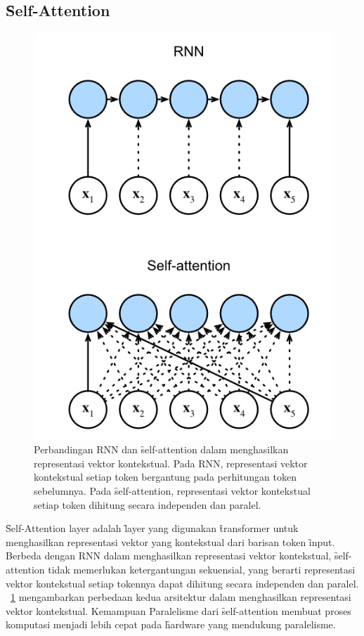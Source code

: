 	\subsection{\f{Self-Attention}}
	\begin{figure}
		\centering
		\includegraphics[width=1\textwidth]{assets/pics/rnn-compare-selfattention.png}
		\caption{Perbandingan RNN dan \f{self-attention} dalam menghasilkan representasi vektor kontekstual. Pada RNN, representasi vektor kontekstual setiap token bergantung pada perhitungan token sebelumnya. Pada \f{self-attention}, representasi vektor kontekstual setiap token dihitung secara independen dan paralel.}
		\label{fig:self-attention-rnn}
	\end{figure}
	\f{Self-Attention layer} adalah \f{layer} yang digunakan \f{transformer} untuk menghasilkan representasi vektor yang kontekstual dari barisan token \f{input}. Berbeda dengan RNN dalam menghasilkan representasi vektor kontekstual, \f{self-attention} tidak memerlukan ketergantungan sekuensial, yang berarti representasi vektor kontekstual setiap tokennya dapat dihitung secara independen dan paralel. \pic~\ref{fig:self-attention-rnn} mengambarkan perbedaan kedua arsitektur dalam menghasilkan representasi vektor kontekstual. Kemampuan Paralelisme dari \f{self-attention} membuat proses komputasi menjadi lebih cepat pada \f{hardware} yang mendukung paralelisme. 


